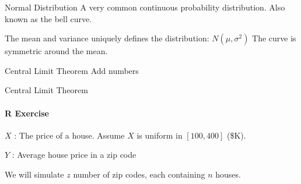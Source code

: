 \documentclass{beamer}\usepackage[]{graphicx}\usepackage[]{color}
\begin{document}
\begin{darkframes}
	\begin{frame}[label=lists]{Normal Distribution}
		A very common continuous probability distribution. Also known as the \alert{bell curve}.
		
		
		The mean and variance uniquely defines the distribution: $N(\mu,\sigma^2)$		
		The curve is symmetric around the mean.
		
		
   			
	\end{frame}
	
	
	
	
	
	\begin{frame}[label=lists]{Central Limit Theorem}
		Add numbers
		

   			
	\end{frame}	
	
	
	
	
	
	
	
	
	\begin{frame}[label=lists]{Central Limit Theorem}
		\framesubtitle{R Exercise} 
		 $X$ : The price of a house. Assume $X$ is uniform in $[100,400]$ (\$K).
		 
		 $Y$ : Average house price in a zip code
		 
		 We will simulate $z$ number of zip codes, each containing $n$ houses.		 	
		
		
		\housePrices
   			
	\end{frame}	










\end{darkframes}
  
  
  
\end{document}
